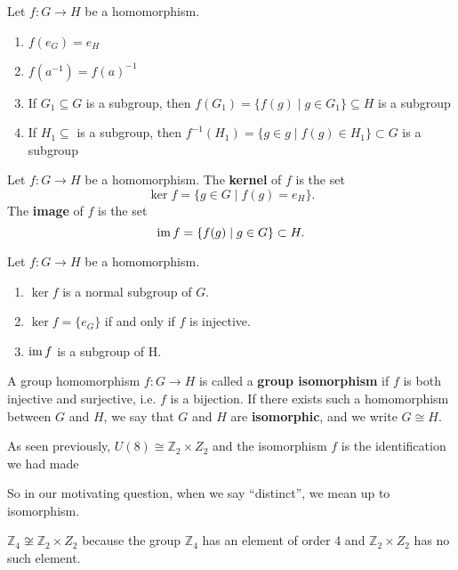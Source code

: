 \begin{proposition}
	Let $f\colon G\to H$ be a homomorphism.
	\begin{enumerate}
		\item $f(e_G)=e_H$
		\item $f(a^{-1})=f(a)^{-1}$
		\item If $G_1\subseteq G$ is a subgroup, then $f(G_1)=\{f(g)\mid g\in G_1\}\subseteq H$ is a subgroup
		\item If $H_1\subseteq$ is a subgroup, then $f^{-1}(H_1)=\{g\in g\mid f(g)\in H_1\}\subset G$ is a subgroup
	\end{enumerate}
\end{proposition}

\begin{definition}
	Let $f\colon G\to H$ be a homomorphism. The \textbf{kernel} of $f$ is the set
	$$\ker f=\{g\in G\mid f(g)=e_H\}.$$
	The \textbf{image} of $f$ is the set
	$$\operatorname{im} f=\{f(g)\mid g\in G\}\subset H.$$
\end{definition}

\begin{proposition}
Let $f\colon G\to H$ be a homomorphism.
	\begin{enumerate}
		\item $\ker f$ is a normal subgroup of $G$.
		\item $\ker f=\{e_G\}$ if and only if $f$ is injective.
		\item $\operatorname{im} f$ is a subgroup of H.
	\end{enumerate}
\end{proposition}

\begin{definition}
	A group homomorphism $f\colon G\to H$ is called a \textbf{group isomorphism} if $f$ is both injective and surjective, i.e. $f$ is a bijection. If there exists such a homomorphism between $G$ and $H$, we say that $G$ and $H$ are \textbf{isomorphic}, and we write $G\cong H$.
\end{definition}

\begin{example}
	As seen previously, $U(8)\cong \mathbb Z_2\times Z_2$ and the isomorphism $f$ is the identification we had made
\end{example}

So in our motivating question, when we say ``distinct'', we mean up to isomorphism.

\begin{example}
	$\mathbb Z_4\not\cong\mathbb Z_2\times Z_2$ because the group $\mathbb Z_4$ has an element of order 4 and $\mathbb Z_2\times Z_2$ has no such element.
\end{example}

